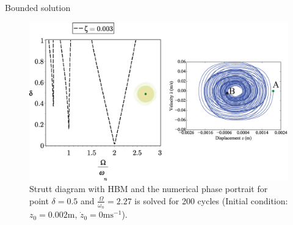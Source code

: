 \documentclass[LaTeX2e,10pt]{beamer}
\begin{document}
\begin{frame}{Bounded solution}
\begin{figure}
	\centering
	\includegraphics[width=\linewidth]{Images/2/StuttDiagram1-5-1.eps}
	\caption{Strutt diagram with HBM and the numerical phase portrait for point $\delta = 0.5$ and $\frac{\Omega}{\omega_n} = 2.27$ is solved for 200 cycles (Initial condition: $z_0 = 0.002 \mathrm{m}$, $\dot{z}_0 = 0 \mathrm{ms^{-1}}$).}
\end{figure}
\end{frame}
\end{document}
